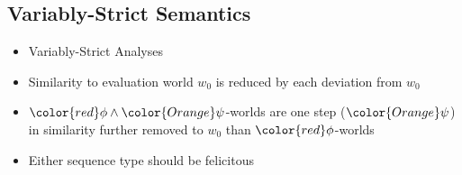 \subsection{Variably-Strict Semantics}
\begin{frame}[t]
\subsectionpage\vskip 9pt
\vskip 18pt
\begin{itemize}
            \item<1-> Variably-Strict Analyses \citep{Stalnaker1968,Lewis1973}
\end{itemize}\vskip 9pt
\vskip 18pt
\begin{itemize}
    \item<3-> Similarity to evaluation world $w_0$ is reduced by each deviation from $w_0$ \citep{Lewis1973}
\end{itemize}
\end{frame}

\begin{frame}[t]
\subsectionpage\vskip 9pt
\begin{itemize}
    \item<1-> ${\color{red}\phi}\land{\color{Orange}\psi}$-worlds are one step ($\color{Orange}\psi$) in similarity further removed to $w_0$ than $\color{red}\phi$-worlds
\end{itemize}\vskip 9pt
\begin{figure}[ht!]
\centering

\end{figure}
\begin{itemize}
    \item<4-> Either sequence type should be felicitous
\end{itemize}
\end{frame}



